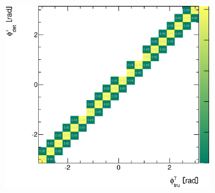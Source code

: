 \documentclass[12pt, twoside]{article}
\numberwithin{equation}{section}
\numberwithin{figure}{section}
\newenvironment{changemargin}[2]{%
\begin{list}{}{%
\setlength{\topsep}{0pt}%
\setlength{\leftmargin}{#1}%
\setlength{\rightmargin}{#2}%
\setlength{\listparindent}{\parindent}%
\setlength{\itemindent}{\parindent}%
\setlength{\parsep}{\parskip}%
}%
\item[]}{\end{list}}
\begin{document}
\begin{figure}
\begin{changemargin}{-1.0cm}{-0.75cm}
\begin{changemargin}{-0.75cm}{-1.0cm}
\begin{subfigure}[b]{0.37\textwidth}
            \subcaption{}
            \label{fig:SherpaCorrelationEtaPhoton}
        \end{subfigure}
        \begin{subfigure}[b]{0.37\textwidth}
            \includegraphics[width=\textwidth]{./images/CorrelationMatricesSherpa/REC_vs_HAD-103.eps}
            \subcaption{}
            \label{fig:SherpaCorrelationPhiPhoton}
        \end{subfigure}


\end{changemargin}
\end{changemargin}
\end{figure}
\end{document}
